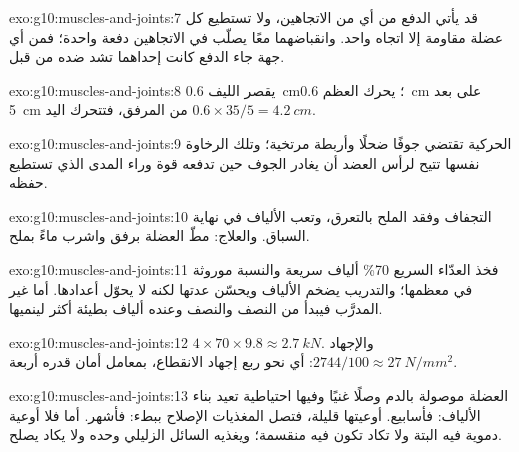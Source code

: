 \begin{solution}{exo:g10:muscles-and-joints:7}
قد يأتي الدفع من أي من الاتجاهين، ولا تستطيع كل عضلة مقاومة إلا اتجاه
واحد. وانقباضهما معًا يصلّب  في الاتجاهين دفعة واحدة؛ فمن أي
جهة جاء الدفع كانت إحداهما تشد ضده من قبل.
\end{solution}

\begin{solution}{exo:g10:muscles-and-joints:8}
يقصر الليف \qty{0.6}{cm}؛  يحرك العظم \qty{0.6}{cm} على بعد
\qty{5}{cm} من المرفق، فتتحرك اليد
$0.6 \times 35/5 = \qty{4.2}{cm}$.
\end{solution}

\begin{solution}{exo:g10:muscles-and-joints:9}
الحركية تقتضي جوفًا ضحلًا وأربطة مرتخية؛ وتلك الرخاوة نفسها تتيح لرأس
العضد أن يغادر الجوف حين تدفعه قوة وراء المدى الذي تستطيع 
حفظه.
\end{solution}

\begin{solution}{exo:g10:muscles-and-joints:10}
التجفاف وفقد الملح بالتعرق، وتعب الألياف في نهاية السباق. والعلاج:
مطّ العضلة برفق واشرب ماءً بملح.
\end{solution}

\begin{solution}{exo:g10:muscles-and-joints:11}
فخذ العدّاء السريع 70\% ألياف سريعة والنسبة موروثة في معظمها؛ والتدريب
يضخم الألياف ويحسّن عدتها لكنه لا يحوّل أعدادها. أما غير المدرَّب فيبدأ
من النصف والنصف وعنده ألياف بطيئة أكثر لينميها.
\end{solution}

\begin{solution}{exo:g10:muscles-and-joints:12}
$4 \times 70 \times 9.8 \approx \qty{2.7}{kN}$. والإجهاد $2744/100
\approx \qty{27}{N/mm^2}$: أي نحو ربع إجهاد الانقطاع، بمعامل أمان
قدره أربعة.
\end{solution}

\begin{solution}{exo:g10:muscles-and-joints:13}
العضلة موصولة بالدم وصلًا غنيًا وفيها  احتياطية تعيد بناء
الألياف: فأسابيع.  أوعيتها قليلة، فتصل المغذيات  الإصلاح
ببطء: فأشهر. أما  فلا أوعية دموية فيه البتة ولا تكاد تكون فيه
 منقسمة؛ ويغذيه السائل الزليلي وحده ولا يكاد يصلح.
\end{solution}

